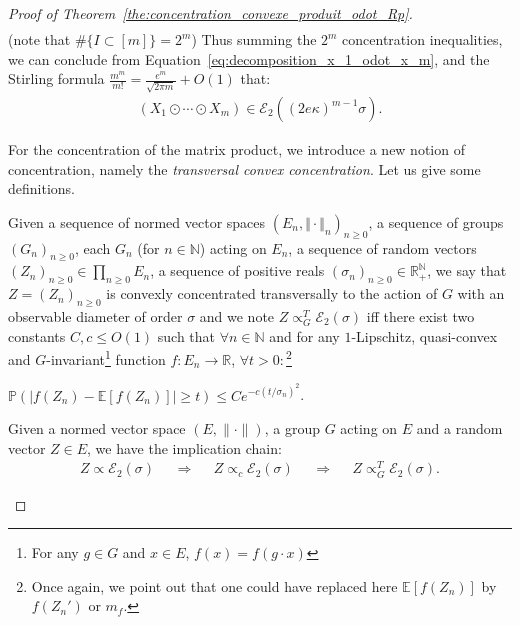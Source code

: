 \documentclass{ws-rmta}
\begin{document}
\begin{proof}[Proof of Theorem~\ref{the:concentration_convexe_produit_odot_Rp}]
\begin{align*}
  \end{align*}
  (note that $\#\{I \subset [m]\} = 2^m$)
  Thus summing the $2^m$ concentration inequalities, we can conclude from Equation~\eqref{eq:decomposition_x_1_odot_x_m}, and the Stirling formula $\frac{m^m}{m!} = \frac{e^m}{\sqrt{2\pi m}} +O(1)$ that:
  \begin{align*}
     (X_1\odot \cdots \odot X_m) \in \mathcal E_2 \left((2e\kappa)^{m-1} \sigma\right).
  \end{align*}



For the concentration of the matrix product, we introduce a new notion of concentration, namely the \textit{transversal convex concentration}. Let us give some definitions.
\begin{definition}\label{def:concentrtaion_transversale}
  
  Given a sequence of normed vector spaces $(E_n, \Vert \cdot \Vert_n)_{n\geq 0}$, a sequence of groups $(G_n)_{n\geq 0}$, each $G_n$ (for $n \in \mathbb N$) acting on $E_n$, a sequence of random vectors $(Z_n)_{n\geq 0} \in \prod_{n\geq 0} E_n$, a sequence of positive reals $(\sigma_n)_{n\geq 0} \in \mathbb R_+ ^{\mathbb N}$, we say that $Z =(Z_n)_{n\geq 0}$ 
  is convexly concentrated transversally to the action of $G$ with an observable diameter of order $\sigma$ and we note $Z \propto^T_G \mathcal E_2(\sigma)$ iff there exist two constants $C,c \leq O(1)$ such that $\forall n \in \mathbb N$ and for any $1$-Lipschitz, quasi-convex and $G$-invariant\footnote{For any $g \in G$ and $x \in E$, $f(x) = f(g \cdot x)$} function $f : E_n \to \mathbb R$,
  $\forall t>0:$\footnote{Once again, we point out that one could have replaced here $\mathbb E[f(Z_n)]$ by $f(Z_n')$ or $m_f$.} 
     \begin{center}
      $\mathbb P \left(\left\vert f(Z_n) - \mathbb E[f(Z_n)]\right\vert\geq t\right) \leq C e^{-c(t/\sigma_n)^2}$.
     \end{center}
\end{definition}
\begin{remark}\label{rem:concentration_convexe_implique_concentration_transversale}
  Given a normed vector space $(E,\|\cdot \|)$, a group $G$ acting on $E$ and a random vector $Z \in E$, we have the implication chain:
  \begin{align*}
    Z \propto \mathcal E_2(\sigma)&
    &\Longrightarrow&
    &Z \propto_c \mathcal E_2(\sigma)&
    &\Longrightarrow&
    &Z \propto_G^T \mathcal E_2(\sigma).
  \end{align*}
\end{remark}
 

\end{proof}
\end{document}
